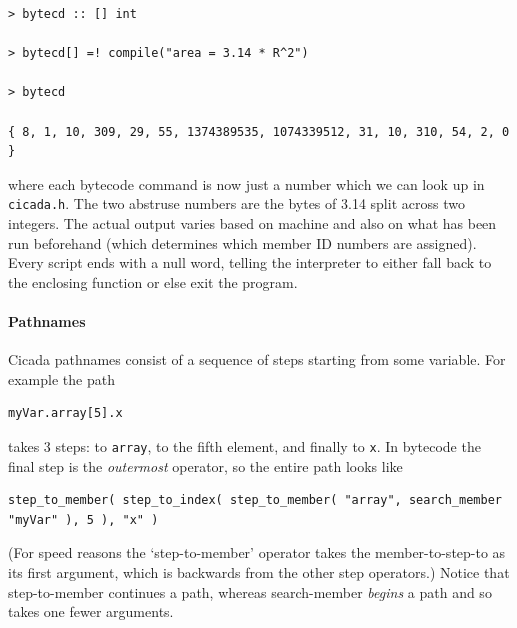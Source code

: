 \documentclass{article}
\newenvironment{code}{
       \begin{list}{}{
               \setlength{\leftmargin}{.4in}
               \setlength{\rightmargin}{0in}
               \setlength{\topsep}{.2in}
       }
       \small
       \item[] }
       { \end{list}   }
\begin{document}
\begin{code} \begin{verbatim}
> bytecd :: [] int

> bytecd[] =! compile("area = 3.14 * R^2")

> bytecd

{ 8, 1, 10, 309, 29, 55, 1374389535, 1074339512, 31, 10, 310, 54, 2, 0 }
\end{verbatim} \end{code}

\noindent where each bytecode command is now just a number which we can look up in \verb#cicada.h#.  The two abstruse numbers are the bytes of 3.14 split across two integers.  The actual output varies based on machine and also on what has been run beforehand (which determines which member ID numbers are assigned).   Every script ends with a null word, telling the interpreter to either fall back to the enclosing function or else exit the program.



\paragraph{Pathnames} 

Cicada pathnames consist of a sequence of steps starting from some variable.  For example the path 

\begin{code} \begin{verbatim}
myVar.array[5].x
\end{verbatim} \end{code}

\noindent takes 3 steps:  to \verb#array#, to the fifth element, and finally to \verb#x#.  In bytecode the final step is the \emph{outermost} operator, so the entire path looks like

\begin{code} \begin{verbatim}
step_to_member( step_to_index( step_to_member( "array", search_member "myVar" ), 5 ), "x" )
\end{verbatim} \end{code}

\noindent (For speed reasons the `step-to-member' operator takes the member-to-step-to as its first argument, which is backwards from the other step operators.)  Notice that step-to-member continues a path, whereas search-member \emph{begins} a path and so takes one fewer arguments.
\end{document}
